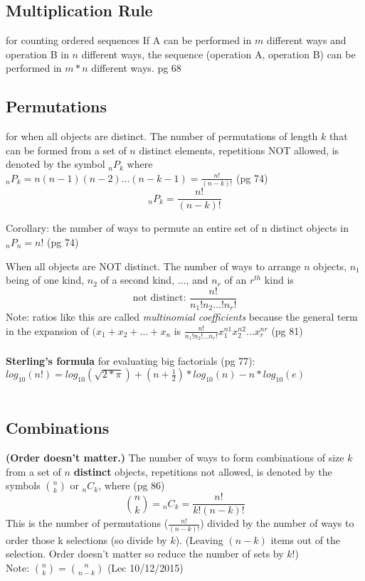 \subsection{Multiplication Rule} for counting ordered sequences
If A can be performed in $m$ different ways and operation B in $n$ different ways, the sequence (operation A, operation B) can be performed in $m*n$ different ways. {\tiny pg 68}

\subsection{Permutations} for when all objects are distinct.
The number of permutations of length $k$ that can be formed from a set of $n$ distinct elements, repetitions NOT allowed, is denoted by the symbol ${_n}P_k$ where ${_n}P_k = n(n-1)(n-2) \dots (n - k - 1) = \frac{n!}{(n-k)!}$  {\tiny (pg 74) }\hfill \\
\[  {_n}P_k = \frac{n!}{(n-k)!} \]

Corollary: the number of ways to permute an entire set of n distinct objects in ${_n}P_n = n!$    {\tiny (pg 74) }\

When all objects are NOT distinct.  The number of ways to arrange $n$ objects, $n_1$ being of one kind, $n_2$ of a second kind, $\dots$, and $n_r$ of an $r^{th}$ kind is 
\[ \mbox{not distinct: } \frac{n!}{n{_1}!n{_2} \dots !n{_r!}} \]
Note: ratios like this are called \textit{multinomial coefficients} because the general term in the expansion of $(x_1 + x_2 + \dots + x_n$ is $\frac{n!}{n_1!n_2!\dots n_r!}x_1^{n1}x_2^{n2} \dots x_r^{nr}$  {\tiny (pg 81) }\hfill \\
\hfill \\
\textbf{Sterling's formula} for evaluating big factorials {\tiny (pg 77)}: $log_{10}(n!) = log_{10}(\sqrt{2*\pi}) + (n + \frac{1}{2})*log_{10}(n) - n*log_{10}(e)$ \hfill \\
\hfill \\

\subsection{Combinations}
\textbf{(Order doesn't matter.)} The number of ways to form combinations of size $k$ from a set of $n$ \textbf{distinct} objects, repetitions not allowed, is denoted by the symbols $\binom{n}{k}$ or ${_n}C_k$, where   {\tiny (pg 86)}
	\[ {n \choose k} = {_n}C_k = \frac{n!}{k!(n-k)!} \]
This is the number of permutations ($\frac{n!}{(n-k)!}$) divided by the number of ways to order those k selections (so divide by $k$).
(Leaving $(n-k)$ items out of the selection.  Order doesn't matter so reduce the number of sets by $k!$) \hfill \\
Note: ${n \choose k} = {n \choose n - k}$  (Lec 10/12/2015)

